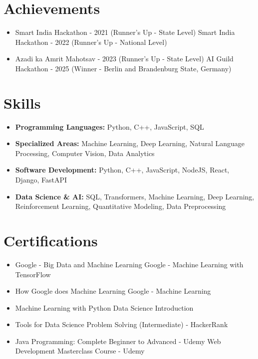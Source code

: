 \documentclass[a4paper,10pt]{article}
\begin{document}
\section*{Achievements}
\begin{itemize}
\item Smart India Hackathon - 2021 (Runner's Up - State Level) \hfill Smart India Hackathon - 2022 (Runner's Up - National Level)
\item Azadi ka Amrit Mahotsav - 2023 (Runner's Up - State Level) \hfill AI Guild Hackathon - 2025 (Winner - Berlin and Brandenburg State, Germany)
\end{itemize}

\section*{Skills}
\begin{itemize}
  \item \textbf{Programming Languages:} Python, C++, JavaScript, SQL
  \item \textbf{Specialized Areas:} Machine Learning, Deep Learning, Natural Language Processing, Computer Vision, Data Analytics
  \item \textbf{Software Development:} Python, C++, JavaScript, NodeJS, React, Django, FastAPI
  \item \textbf{Data Science \& AI:} SQL, Transformers, Machine Learning, Deep Learning, Reinforcement Learning, Quantitative Modeling, Data Preprocessing
\end{itemize}

\section*{Certifications}
\begin{itemize}
\item Google - Big Data and Machine Learning \hfill Google - Machine Learning with TensorFlow
\item How Google does Machine Learning \hfill Google - Machine Learning
\item Machine Learning with Python \hfill Data Science Introduction
\item Tools for Data Science \hfill Problem Solving (Intermediate) - HackerRank
\item Java Programming: Complete Beginner to Advanced - Udemy \hfill Web Development Masterclass Course - Udemy
\end{itemize}
\end{document}
